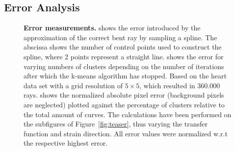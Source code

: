 \documentclass[journal]{vgtc}                %
\begin{document}
\subsection{Error Analysis}\label{subsec:error}
\begin{figure}[t]
    \centering

    \caption{\textbf{Error measurements.}  shows the error introduced by the approximation of the correct bent ray by sampling a spline. The abscissa shows the number of control points used to construct the spline, where 2 points represent a straight line.  shows the error for varying numbers of clusters depending on the number of iterations after which the k-means algorithm has stopped. Based on the heart data set with a grid resolution of $5\times5$, which resulted in 360.000 rays.  shows the normalized absolute pixel error (background pixels are neglected) plotted against the percentage of clusters relative to the total amount of curves. The calculations have been performed on the subfigures of Figure~\ref{fig:teaser}, thus varying the transfer function and strain direction. All error values were normalized w.r.t the respective highest error.}
    \label{fig:error}
\end{figure}
\end{document}
